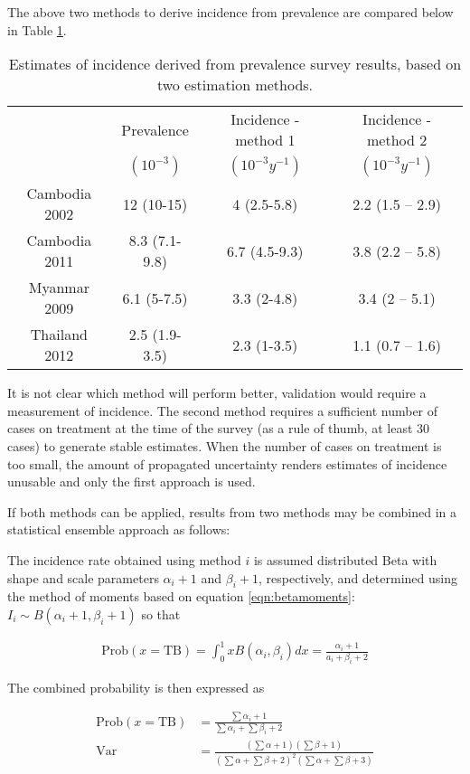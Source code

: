 The above two methods to derive incidence from prevalence are compared below in Table \ref{tab:2methods}.

\begin{table} 
    \begin{tabular}{ c c c c }
    \hline
         & Prevalence & Incidence - method 1 & Incidence - method 2 \\ 
         & $(10^{-3})$  & $(10^{-3} y^{-1})$     & $(10^{-3} y^{-1})$ \\
    \hline
        Cambodia 2002 & 12 (10-15) & 4 (2.5-5.8) & 2.2 (1.5 – 2.9) \\ 
        Cambodia 2011 & 8.3 (7.1-9.8) & 6.7 (4.5-9.3) & 3.8 (2.2 – 5.8) \\ 
        Myanmar 2009 & 6.1 (5-7.5) & 3.3 (2-4.8) & 3.4 (2 – 5.1) \\ 
        Thailand 2012 & 2.5 (1.9-3.5) & 2.3 (1-3.5) & 1.1 (0.7 – 1.6) \\ 
    \hline
    \end{tabular} 
    \caption{Estimates of incidence derived from prevalence survey results, based on two estimation methods.} 
    \label{tab:2methods}
\end{table}

It is not clear which method will perform better, validation would require a measurement of incidence. The second method requires a sufficient number of cases on treatment at the time of the survey (as a rule of thumb, at least 30 cases) to generate stable estimates. When the number of cases on treatment is too small, the amount of propagated uncertainty renders estimates of incidence unusable and only the first approach is used. 

If both methods can be applied, results from two methods may be combined in a statistical ensemble approach as follows:

The incidence rate obtained using method $i$ is assumed distributed Beta with shape and scale parameters $\alpha_i + 1$ and $\beta_i + 1$, respectively, and determined using the method of moments based on equation \ref{eqn:betamoments}: $I_i \sim B(\alpha_i + 1, \beta_i + 1)$ so that 

\begin{align*}
\textrm{Prob}(x = \textrm{TB})= \int_{0}^{1} x B(\alpha_i, \beta_i) dx = \frac{\alpha_i+1}{a_i+\beta_i+2}
\end{align*}

The combined probability is then expressed as 

\begin{align*}
\textrm{Prob}(x = \textrm{TB}) &= \frac{\sum{\alpha_i}+1}{\sum{\alpha_i}+\sum{\beta_i}+2} \\
\textrm{Var} &= \frac{(\sum{\alpha} +1)(\sum{\beta} +1)}{(\sum{\alpha} + \sum{\beta} + 2)^2 (\sum{\alpha} + \sum{\beta} + 3)}
\end{align*}

